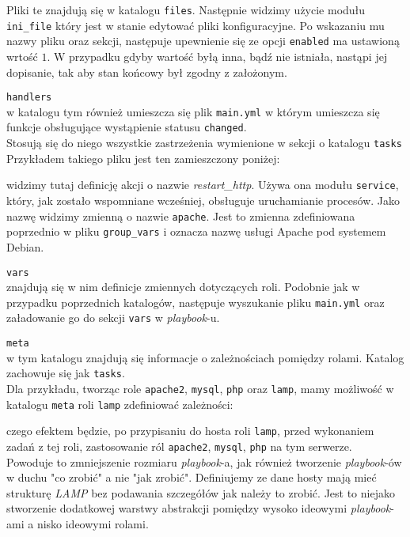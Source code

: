 \begin{description}
		Pliki te znajdują się w katalogu \texttt{files}.
		Następnie widzimy użycie modułu \texttt{ini\_file} który jest w stanie edytować pliki konfiguracyjne.
		Po wskazaniu mu nazwy pliku oraz sekcji, następuje upewnienie się ze opcji \texttt{enabled} ma ustawioną wrtość $1$.
		W przypadku gdyby wartość byłą inna, bądź nie istniała, nastąpi jej dopisanie, tak aby stan końcowy był zgodny z założonym.
	\item{\texttt{handlers}}\\
		w katalogu tym również umieszcza się plik \texttt{main.yml} w którym umieszcza się funkcje obsługujące wystąpienie statusu \texttt{changed}.\\
		Stosują się do niego wszystkie zastrzeżenia wymienione w sekcji o katalogu \texttt{tasks}
		Przykładem takiego pliku jest ten zamieszczony poniżej:
		
		widzimy tutaj definicję akcji o nazwie \textit{restart\_http}.
		Używa ona modułu \texttt{service}, który, jak zostało wspomniane wcześniej, obsługuje uruchamianie procesów.
		Jako nazwę widzimy zmienną o nazwie \texttt{apache}.
		Jest to zmienna zdefiniowana poprzednio w pliku \texttt{group\_vars} i oznacza nazwę usługi Apache pod systemem Debian.
	\item{\texttt{vars}}\\
		znajdują się w nim definicje zmiennych dotyczących roli.
		Podobnie jak w przypadku poprzednich katalogów, następuje wyszukanie pliku \texttt{main.yml} oraz załadowanie go do sekcji \texttt{vars} w \textit{playbook}-u.
	\item{\texttt{meta}}\\
		w tym katalogu znajdują się informacje o zależnościach pomiędzy rolami.
		Katalog zachowuje się jak \texttt{tasks}.\\
		Dla przykładu, tworząc role \texttt{apache2}, \texttt{mysql}, \texttt{php} oraz \texttt{lamp}, mamy możliwość w katalogu \texttt{meta} roli \texttt{lamp} zdefiniować zależności:
		
		czego efektem będzie, po przypisaniu do hosta roli \texttt{lamp}, przed wykonaniem zadań z tej roli, zastosowanie ról \texttt{apache2}, \texttt{mysql}, \texttt{php} na tym serwerze.\\
		Powoduje to zmniejszenie rozmiaru \textit{playbook}-a, jak również tworzenie \textit{playbook}-ów w duchu "co zrobić" a nie "jak zrobić".
		Definiujemy ze dane hosty mają mieć strukturę \textit{LAMP} bez podawania szczegółów jak należy to zrobić.
		Jest to niejako stworzenie dodatkowej warstwy abstrakcji pomiędzy wysoko ideowymi \textit{playbook}-ami a nisko ideowymi rolami.\\
\end{description}

